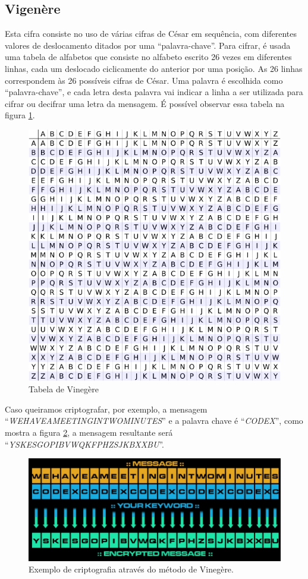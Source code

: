 \documentclass[
article,			%
11pt,				%
oneside,			%
a4paper,			%
english,			%
brazil,				%
sumario=tradicional
]{abntex2}
\begin{document}
			
		\subsection{Vigenère}
			Esta cifra consiste no uso de várias cifras de César em sequência, com diferentes valores de deslocamento ditados por uma ``palavra-chave''. Para cifrar, é usada uma tabela de alfabetos que consiste no alfabeto escrito 26 vezes em diferentes linhas, cada um deslocado ciclicamente do anterior por uma posição. As 26 linhas correspondem às 26 possíveis cifras de César. Uma palavra é escolhida como ``palavra-chave'', e cada letra desta palavra vai indicar a linha a ser utilizada para cifrar ou decifrar uma letra da mensagem. É possível observar essa tabela na figura \ref{fig:vinegere}.		
			
			\begin{figure}[!h]
				\centering
				\includegraphics[width=0.7\linewidth]{Imagens/vinegere}
				\caption{Tabela de Vinegère}
				\label{fig:vinegere}
			\end{figure}
	
			
			Caso queiramos criptografar, por exemplo, a mensagem ``\textit{WEHAVEAMEETINGINTWOMINUTES}'' e a palavra chave é ``\textit{CODEX}'', como mostra a figura \ref{fig:venegere2}, a mensagem resultante será ``\textit{YSKESGOPIBVWQKFPHZSJKBXXBU}''.
				
			\begin{figure} [h!]
				\centering
				\includegraphics[width=0.7\linewidth]{Imagens/vinegere2.png}
				\caption{Exemplo de criptografia através do método de Vinegère.}
				\label{fig:venegere2}
			\end{figure}
			
\end{document}
